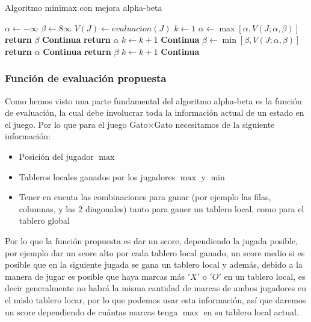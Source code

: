 \documentclass[runningheads]{llncs}
\begin{document}
\begin{algorithm}[H]
\caption{Algoritmo minimax con mejora alpha-beta}\label{alg:2}
\begin{algorithmic}
\State $\alpha \gets -\infty$
\State $\beta \gets 8\infty$
    \State $V(J) \gets evaluacion(J)$
\State $k \gets 1$
        \State $\alpha \gets  \max [\alpha, V(J;\alpha,\beta)]$
        \If{$\alpha \geq \beta$}
            \State \textbf{return} $ \beta$
        \Else
            \State \textbf{Continua}
        \EndIf
            \State \textbf{return} $\alpha$
        \Else
            \State $k \gets k+1$
            \State \textbf{Continua}
        \EndIf
    \EndIf
        \State $\beta \gets \min[\beta,V(J;\alpha,\beta)]$
        \If{$\beta \leq \alpha$}
            \State \textbf{return} $\alpha$
        \Else
            \State \textbf{Continua}
        \EndIf
            \State \textbf{return} $\beta$
        \Else
            \State $k \gets k+1$
            \State \textbf{Continua}
        \EndIf
    \EndIf
\EndIf 
\end{algorithmic}
\end{algorithm}
\subsubsection{Función de evaluación propuesta}
Como hemos visto una parte fundamental del algoritmo alpha-beta es la función de evaluación, la cual debe involucrar toda la información actual de un estado en el juego. Por lo que para el juego Gato$\times$Gato necesitamos de la siguiente información:
\begin{itemize}
    \item Posición del jugador $\max$
    \item Tableros locales ganados por los jugadores $\max$ y $\min$
    \item Tener en cuenta las combinaciones para ganar (por ejemplo las filas, columnas, y las 2 diagonales) tanto para ganer un tablero local, como para el tablero global
\end{itemize}
Por lo que la función propuesta es dar un score, dependiendo la jugada posible, por ejemplo dar un score alto por cada tablero local ganado, un score medio si es posible que en la siguiente jugada se gana un tablero local y además, debido a la manera de jugar es posible que haya marcas más $'X'$ o $'O'$ en un tablero local, es decir generalmente no habrá la misma cantidad de marcas de ambos jugadores en el mislo tablero locar, por lo que podemos usar esta información, así que daremos un score dependiendo de cuántas marcas tenga $\max$ en su tablero local actual. 
\end{document}
